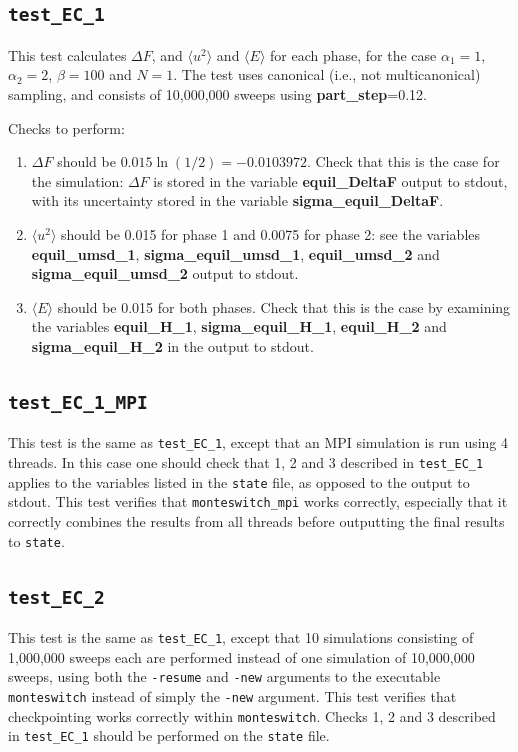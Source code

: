 \documentclass{report}
\begin{document}
\subsection{\texttt{test\_EC\_1}}
This test calculates $\Delta F$, and $\langle u^2\rangle$ and $\langle E\rangle$ for each phase, for the case $\alpha_1=1$, $\alpha_2=2$,
$\beta=100$ and $N=1$. The test uses canonical (i.e., not multicanonical) sampling, and consists of 10,000,000 sweeps using 
\textbf{part\_step}=0.12.

Checks to perform:
\begin{enumerate}
\item
$\Delta F$ should be $0.015\ln(1/2)=-0.0103972$. Check that this is the case for the simulation: $\Delta F$ is stored in 
the variable \textbf{equil\_DeltaF} output to stdout, with its uncertainty stored in the variable \textbf{sigma\_equil\_DeltaF}. 
\item
$\langle u^2\rangle$ should be 0.015 for phase 1 and 0.0075 for phase 2: see the 
variables \textbf{equil\_umsd\_1}, \textbf{sigma\_equil\_umsd\_1}, \textbf{equil\_umsd\_2} and \textbf{sigma\_equil\_umsd\_2} 
output to stdout.
\item
$\langle E\rangle$ should be 0.015 for both phases. Check that this is the case by examining the variables 
\textbf{equil\_H\_1}, \textbf{sigma\_equil\_H\_1}, \textbf{equil\_H\_2} and \textbf{sigma\_equil\_H\_2} in the output to stdout. 
\end{enumerate}


\subsection{\texttt{test\_EC\_1\_MPI}}
This test is the same as \texttt{test\_EC\_1}, except that an MPI simulation is run using 4 threads. In this case one should check that
1, 2 and 3 described in \texttt{test\_EC\_1} applies to the variables listed in the \texttt{state} file, as opposed to the
output to stdout. This test verifies that \texttt{monteswitch\_mpi} works correctly, especially that it correctly combines
the results from all threads before outputting the final results to \texttt{state}.


\subsection{\texttt{test\_EC\_2}}
This test is the same as \texttt{test\_EC\_1}, except that 10 simulations consisting of 1,000,000 sweeps each are performed
instead of one simulation of 10,000,000 sweeps, using both the \texttt{-resume} and \texttt{-new} arguments to the executable 
\texttt{monteswitch} instead of simply the \texttt{-new} argument. This test verifies that checkpointing works
correctly within \texttt{monteswitch}. Checks 1, 2 and 3 described in \texttt{test\_EC\_1} should be performed on the 
\texttt{state} file.
\end{document}
